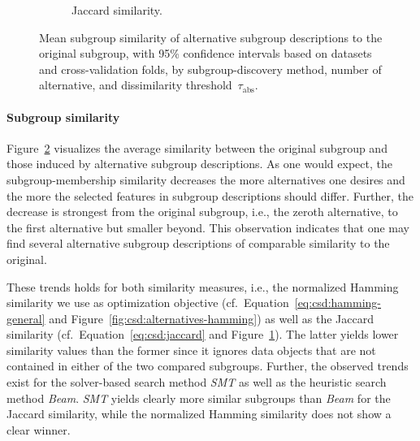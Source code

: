 \documentclass{article}
\theoremstyle{definition}
\begin{document}
\begin{figure}[t]
\begin{subfigure}[t]{0.48\textwidth}
		\caption{Jaccard similarity.}
		\label{fig:csd:alternatives-jaccard}
	\end{subfigure}
	\caption{
		Mean subgroup similarity of alternative subgroup descriptions to the original subgroup, with 95\% confidence intervals based on datasets and cross-validation folds, by subgroup-discovery method, number of alternative, and dissimilarity threshold~$\tau_{\text{abs}}$.
	}
	\label{fig:csd:alternatives-similarity}
\end{figure}

\paragraph{Subgroup similarity}

Figure~\ref{fig:csd:alternatives-similarity} visualizes the average similarity between the original subgroup and those induced by alternative subgroup descriptions.
As one would expect, the subgroup-membership similarity decreases the more alternatives one desires and the more the selected features in subgroup descriptions should differ.
Further, the decrease is strongest from the original subgroup, i.e., the zeroth alternative, to the first alternative but smaller beyond.
This observation indicates that one may find several alternative subgroup descriptions of comparable similarity to the original.

These trends holds for both similarity measures, i.e., the normalized Hamming similarity we use as optimization objective (cf.~Equation~\ref{eq:csd:hamming-general} and Figure~\ref{fig:csd:alternatives-hamming}) as well as the Jaccard similarity (cf.~Equation~\ref{eq:csd:jaccard} and Figure~\ref{fig:csd:alternatives-jaccard}).
The latter yields lower similarity values than the former since it ignores data objects that are not contained in either of the two compared subgroups.
Further, the observed trends exist for the solver-based search method \emph{SMT} as well as the heuristic search method \emph{Beam}.
\emph{SMT} yields clearly more similar subgroups than \emph{Beam} for the Jaccard similarity, while the normalized Hamming similarity does not show a clear winner.
\end{document}
